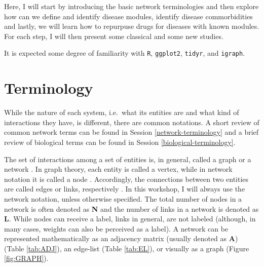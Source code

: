 \documentclass[
]{book}
\begin{document}
Here, I will start by introducing the basic network terminologies and then explore how can we define and identify disease modules, identify disease commorbidities and lastly, we will learn how to repurpuse drugs for diseases with known modules. For each step, I will then present some classical and some new studies.

It is expected some degree of familiarity with \texttt{R}, \texttt{ggplot2}, \texttt{tidyr}, and \texttt{igraph}.

\hypertarget{terminology}{%
\section{Terminology}\label{terminology}}

While the nature of each system, i.e.~what its entities are and what kind of interactions they have, is different, there are common notations. A short review of common network terms can be found in Session \ref{network-terminology} and a brief review of biological terms can be found in Session \ref{biological-terminology}.

The set of interactions among a set of entities is, in general, called a graph or a network \citep{Newman2018, Barabasi2016}. In graph theory, each entity is called a vertex, while in network notation it is called a node \citep{Barabasi2016}. Accordingly, the connections between two entities are called edges or links, respectively \citep{Barabasi2016}. In this workshop, I will always use the network notation, unless otherwise specified. The total number of nodes in a network is often denoted as \textbf{N} and the number of links in a network is denoted as \textbf{L}. While nodes can receive a label, links in general, are not labeled \citep{Barabasi2016} (although, in many cases, weights can also be perceived as a label). A network can be represented mathematically as an adjacency matrix (usually denoted as \textbf{A}) (Table \ref{tab:ADJ}), an edge-list (Table \ref{tab:EL}), or visually as a graph (Figure \ref{fig:GRAPH}).
\end{document}
